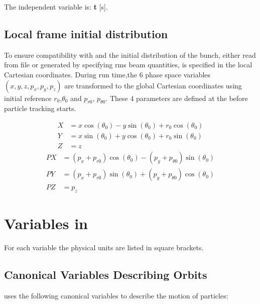 The independent variable is: \textbf{t} [s].


\subsection{Local frame initial distribution}
\label{sec:canon}
To ensure compatibility with \opalt and \opalmap 
the initial distribution of the bunch,
either read from file or generated by specifying rms beam quantities,
is specified in the local Cartesian coordinates.
During run time,the 6 phase space variables \((x, y, z, p_x, p_y, p_z)\) 
are transformed to the global Cartesian coordinates
using initial reference $r_0$,$\theta_0$ and $p_{r0}$, $p_{\theta 0}$.
These 4 parameters are defined at the 
before particle tracking starts. 

\begin{align*}  
X &= x\cos(\theta_0) - y\sin(\theta_0) + r_0\cos(\theta_0)  \\
Y &= x\sin(\theta_0) + y\cos(\theta_0) + r_0\sin(\theta_0)  \\
Z &= z 
\end{align*}
\begin{align*}  
PX &= (p_x+p_{r0})\cos(\theta_0) - (p_y+p_{\theta 0})\sin(\theta_0) \\
PY &= (p_x+p_{r0})\sin(\theta_0) + (p_y+p_{\theta 0})\cos(\theta_0) \\
PZ &= p_z 
\end{align*}    

\section{Variables in \opalmap}
\label{sec:variables}
For each variable the physical units are listed in square brackets.

\subsection{Canonical Variables Describing Orbits}
\label{sec:canon}
\opalmap uses the following canonical variables
to describe the motion of particles:

